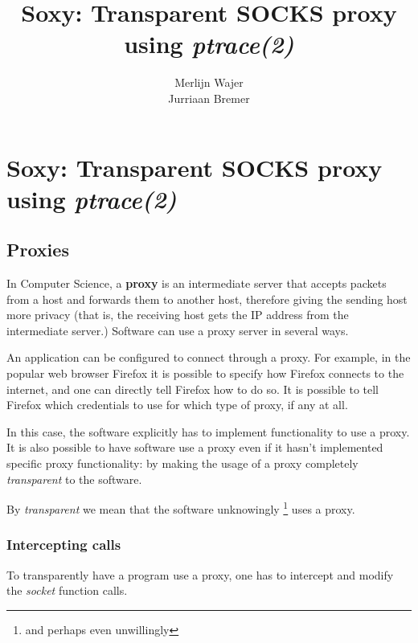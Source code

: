 \documentclass[a4paper]{article}
\author{Merlijn Wajer \\ Jurriaan Bremer}
\title{Soxy: Transparent SOCKS proxy using \textit{ptrace(2)}}
\begin{document}
\maketitle

\section{Soxy: Transparent SOCKS proxy using \textit{ptrace(2)}}

%

\subsection{Proxies}
In Computer Science, a \textbf{proxy} is an intermediate server that accepts packets from a host and forwards them to another host, therefore giving the sending host more privacy (that is, the receiving host gets the IP address from the intermediate server.) Software can use a proxy server in several ways.

An application can be configured to connect through a proxy. For example, in the popular web
browser Firefox it is possible to specify how Firefox connects to the internet,
and one can directly tell Firefox how to do so. It is possible to tell Firefox which credentials to use for which type of proxy, if any at all.

In this case, the software explicitly has to implement functionality to use a
proxy. It is also possible to have software use a proxy even if it hasn't
implemented specific proxy functionality: by making the usage of a proxy
completely \textit{transparent} to the software.

By \textit{transparent} we mean that the software unknowingly
\footnote{and perhaps even unwillingly} uses a proxy.

\subsubsection{Intercepting calls}

To transparently have a program use a proxy, one has to intercept and modify
the \textit{socket} function calls.
\end{document}
